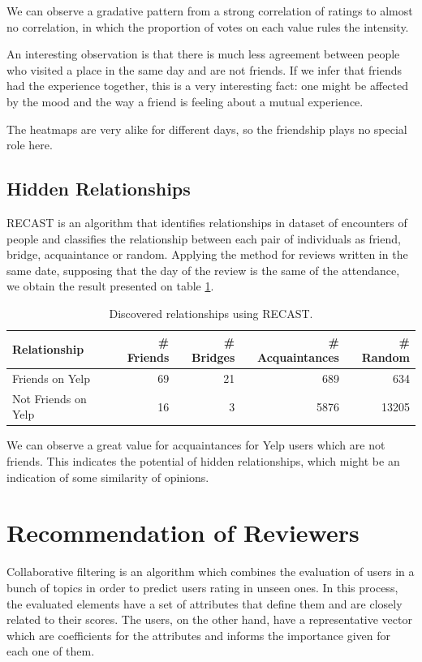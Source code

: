 \documentclass[12pt]{article}
\begin{document}
We can observe a gradative pattern from a strong correlation of ratings to
almost no correlation, in which the proportion of votes on each value rules
the intensity.

An interesting observation is that there is much less agreement
between people who visited a place in the same day and are not friends. If we infer that
friends had the experience together, this is a very interesting fact: one might be affected by the
mood and the way a friend is feeling about a mutual experience.

The heatmaps are very alike for different days, so the friendship plays no special role here.

\subsection{Hidden Relationships}
RECAST\cite{vaz2013recast} is an algorithm that identifies relationships in
dataset of encounters of people and classifies the relationship between each
pair of individuals as friend, bridge, acquaintance or random. Applying the
method for reviews written in the same date, supposing that the day of
the review is the same of the attendance, we obtain the result presented on
table \ref{tab:recast}.

\begin{table}[H]
\begin{tabular}{l|rrrr}
Relationship & \# Friends & \# Bridges & \# Acquaintances & \# Random \\ 
\hline
Friends on Yelp & 69 & 21 & 689 & 634 \\
Not Friends on Yelp & 16 & 3 & 5876 & 13205 \\
\end{tabular}
\caption{Discovered relationships using RECAST.}
\label{tab:recast}
\end{table}

We can observe a great value for acquaintances for Yelp users which are not
friends. This indicates the potential of hidden relationships, which might be an
indication of some similarity of opinions.

\section{Recommendation of Reviewers}
Collaborative filtering is an algorithm which combines the evaluation of
users in a bunch of topics in order to predict users rating in unseen ones. In
this process, the evaluated elements have a set of attributes that define them
and are closely related to their scores. The users, on the other hand, have a
representative vector which are coefficients for the attributes and informs the
importance given for each one of them. 
\end{document}
